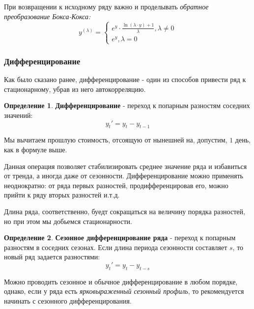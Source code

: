 \documentclass[aps,%
12pt,%
final,%
oneside,
onecolumn,%
musixtex, %
superscriptaddress,%
centertags]{article} %
\theoremstyle{plain}
\theoremstyle{definition}
\newtheorem{definition}{Определение}[subsection]
\theoremstyle{remark}
\begin{document}
При возвращении к исходному ряду важно и проделывать \textit{обратное преобразование Бокса-Кокса:}
$$y^{(\lambda)} = 
\begin{cases}
e^y \cdot  \frac{\ln (\lambda \cdot y) + 1}{\lambda}, \lambda \neq 0 \\
e^y, \lambda = 0
\end{cases}  $$

\subsubsection{Дифференцирование}

Как было сказано ранее, дифференцирование - один из способов привести ряд к стационарному, убрав из него автокорреляцию. 

\begin{definition}
	\textbf{Дифференцирование} - переход к попарным разностям соседних значений:
	$$y_t' = y_t - y_{t-1}$$

	Мы вычитаем прошлую стоимость, отсоящую от нынешней на, допустим, $1$ день, как в формуле выше.
\end{definition}

Данная операция позволяет стабилизировать среднее значение ряда и избавиться от тренда, а иногда даже от сезонности. Дифференцирование можно применять неоднократно: от ряда первых разностей, продифференцировав его, можно прийти к ряду вторых разностей и.т.д.

Длина ряда, соответственно, буедт сокращаться на величину порядка разностей, но при этом мы добьемся стационарности.

\begin{definition}
	\textbf{Сезонное дифференцирование ряда} - переход к попарным разностям в соседних сезонах. Если длина периода сезонности составляет $s$, то новый ряд задается разностями:
	$$y_t' = y_t - y_{t-s}$$ 
\end{definition}

Можно проводить сезонное и обычное дифференцирование в любом порядке, однако, если у ряда есть \textit{ярковыраженный сезонный профиль}, то рекомендуется начинать с сезонного дифференцирования.
\end{document}
